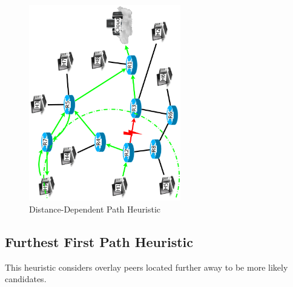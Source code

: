 \documentclass[conference]{IEEEtran}
\begin{document}
\begin{figure}
\centering
\includegraphics[width=2.6in,angle=-90]{../../images/diagrams/ideal_distant_path}
\caption{Distance-Dependent Path Heuristic}
\end{figure}
%
\subsection{Furthest First Path Heuristic}
This heuristic considers overlay peers located further away to be more likely candidates.

\begin{algorithm}
\DontPrintSemicolon
{}
\SetAlgoLined
\SetAlgoLongEnd
\scriptsize
{}
\caption{}
\small
\end{algorithm}
\end{document}
